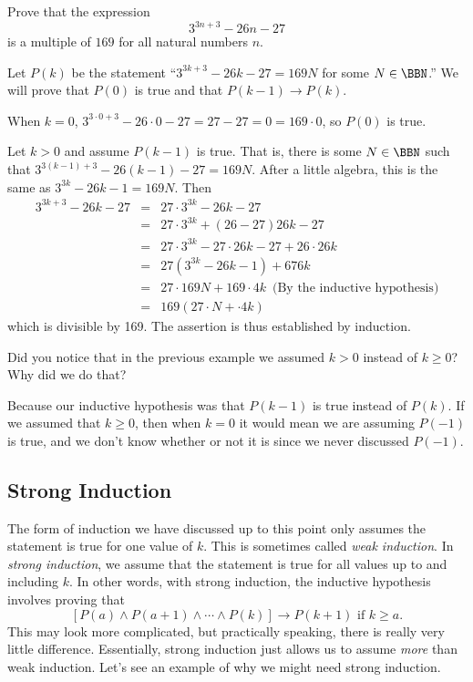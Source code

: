 \begin{exa} 
Prove that the expression $$ 3^{3n + 3} - 26n -
27$$is a multiple of $169$ for all natural numbers $n$.
\begin{pf}
Let $P(k)$ be the statement ``$3^{3k + 3} - 26k - 27 = 169 N$ for some $ N\in\BBN$.'' 
We will prove that $P(0)$ is true and that 
$P(k - 1) \rightarrow P(k)$.

\noindent

\noindent
When $k = 0$, $3^{3\cdot 0 + 3} - 26\cdot 0 - 27= 27-27=0 = 169\cdot 0$, so $P(0)$ is true.

Let $k> 0$ and assume $P(k - 1)$ is true.
That is, there is some $N\in\BBN$ such that 
$3^{3(k - 1) + 3} - 26(k - 1) - 27 = 169N$.  After a little algebra, this is
the same as $3^{3k} - 26k - 1 = 169N$. Then
\begin{eqnarray*}
3^{3k + 3} - 26k - 27 
&=& 27\cdot 3^{3k} - 26k - 27\\
&=& 27\cdot 3^{3k} +(26-27)26k - 27\\
&=& 27\cdot 3^{3k} -27\cdot26 k - 27 + 26\cdot 26k\\
& =& 27(3^{3k} - 26k -1) + 676k\\
&=& 27\cdot 169N + 169\cdot 4k \, \, \, \mbox{(By the inductive hypothesis)}\\
&=& 169(27\cdot N +\cdot 4k)
\end{eqnarray*}
which is divisible by 169. The assertion is thus established by
induction.
\end{pf}
\end{exa}

\begin{ques}
Did you notice that in the previous example we assumed $k>0$ instead of $k\geq 0$?
Why did we do that?

\noindent
\answerline
\begin{answer}
Because our inductive hypothesis was that $P(k-1)$ is true instead of $P(k)$.  
If we assumed that $k\geq 0$, then when $k=0$ it would mean we are assuming $P(-1)$ is true, and
we don't know whether or not it is since we never discussed $P(-1)$.
\end{answer}
\end{ques}


\subsection{Strong Induction}
The form of induction we have discussed up to this point only assumes the statement is true for 
one value of $k$.  This is sometimes called {\em weak induction}.
In {\em strong induction}, we assume that the statement is true for all values up to and including $k$.
In other words, with strong induction, the inductive hypothesis involves proving that 
$$[P(a)\wedge P(a+1)\wedge \cdots \wedge P(k)]\rightarrow P(k+1) 
\mbox{ if } k\geq a.$$
This may look more complicated, but practically speaking, there is really very little difference. 
Essentially, strong induction just allows us to assume {\em more} than weak induction.  
Let's see an example of why we might need strong induction.

